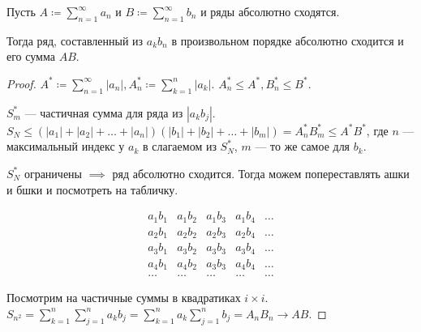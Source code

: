 \begin{theorem}
    Пусть $A \coloneqq \sum\limits_{n=1}^\infty a_n$ и  $B \coloneqq \sum\limits_{n=1}^\infty b_n$ и ряды абсолютно сходятся.

    Тогда ряд, составленный из  $a_kb_n$ в произвольном порядке абсолютно сходится и его сумма  $AB$.
\end{theorem}
\begin{proof}
    $A^* \coloneqq \sum\limits_{n=1}^\infty |a_n|, A_n^* \coloneqq \sum\limits_{k=1}^n |a_k|$.  $A^*_n \le A^*, B_n^* \le B^*$.

    $S_m^*$ --- частичная сумма для ряда из  $|a_kb_j|$. $S_N \le (|a_1| + |a_2| + \ldots + |a_n|)(|b_1| + |b_2| + \ldots + |b_m|) = A_n^* B_m^* \le A^* B^*$, где $n$ --- максимальный индекс у  $a_k$ в слагаемом из  $S_N^*$, $m$ --- то же самое для  $b_k$.

    $S_N^*$ ограничены $\implies$ ряд абсолютно сходится. Тогда можем попереставлять ашки и бшки и посмотреть на табличку.

    $$
    \begin{matrix}
        a_1 b_1 & a_1 b_2 & a_1 b_3 & a_1 b_4 & \dots \\
        a_2 b_1 & a_2 b_2 & a_2 b_3 & a_2 b_4 & \dots \\
        a_3 b_1 & a_3 b_2 & a_3 b_3 & a_3 b_4 & \dots \\
        a_4 b_1 & a_4 b_2 & a_3 b_3 & a_4 b_4 & \dots \\
        \dots & \dots & \dots & \dots & \dots
    \end{matrix}
    $$

    Посмотрим на частичные суммы в квадратиках $i \times i$. $S_{n^2} = \sum\limits_{k=1}^n \sum\limits_{j=1}^n a_k b_j = \sum\limits_{k=1}^n a_k \sum\limits_{j=1}^n b_j = A_nB_n \to AB$.
\end{proof}

